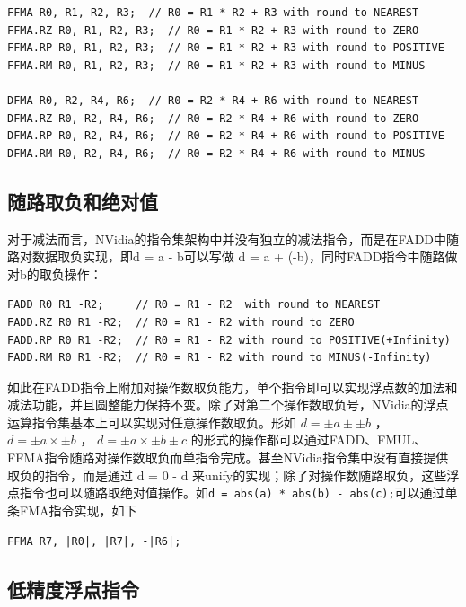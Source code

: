 \begin{lstlisting}
FFMA R0, R1, R2, R3;  // R0 = R1 * R2 + R3 with round to NEAREST
FFMA.RZ R0, R1, R2, R3;  // R0 = R1 * R2 + R3 with round to ZERO
FFMA.RP R0, R1, R2, R3;  // R0 = R1 * R2 + R3 with round to POSITIVE
FFMA.RM R0, R1, R2, R3;  // R0 = R1 * R2 + R3 with round to MINUS

DFMA R0, R2, R4, R6;  // R0 = R2 * R4 + R6 with round to NEAREST
DFMA.RZ R0, R2, R4, R6;  // R0 = R2 * R4 + R6 with round to ZERO
DFMA.RP R0, R2, R4, R6;  // R0 = R2 * R4 + R6 with round to POSITIVE
DFMA.RM R0, R2, R4, R6;  // R0 = R2 * R4 + R6 with round to MINUS
\end{lstlisting}

\subsection{随路取负和绝对值}

对于减法而言，NVidia的指令集架构中并没有独立的减法指令，而是在FADD中随路对数据取负实现，即d = a - b可以写做 d = a + (-b)，同时FADD指令中随路做对b的取负操作：

\begin{lstlisting}
FADD R0 R1 -R2;     // R0 = R1 - R2  with round to NEAREST
FADD.RZ R0 R1 -R2;  // R0 = R1 - R2 with round to ZERO
FADD.RP R0 R1 -R2;  // R0 = R1 - R2 with round to POSITIVE(+Infinity)
FADD.RM R0 R1 -R2;  // R0 = R1 - R2 with round to MINUS(-Infinity)
\end{lstlisting}

如此在FADD指令上附加对操作数取负能力，单个指令即可以实现浮点数的加法和减法功能，并且圆整能力保持不变。除了对第二个操作数取负号，NVidia的浮点运算指令集基本上可以实现对任意操作数取负。形如 $d = \pm a \pm \pm b$ ， $d = \pm a \times \pm b$ ， $d = \pm a \times \pm b   \pm c$ 的形式的操作都可以通过FADD、FMUL、FFMA指令随路对操作数取负而单指令完成。甚至NVidia指令集中没有直接提供取负的指令，而是通过 d = 0 - d 来unify的实现；除了对操作数随路取负，这些浮点指令也可以随路取绝对值操作。如\lstinline|d = abs(a) * abs(b) - abs(c);|可以通过单条FMA指令实现，如下

\begin{lstlisting}
FFMA R7, |R0|, |R7|, -|R6|;
\end{lstlisting}

\subsection{低精度浮点指令}

